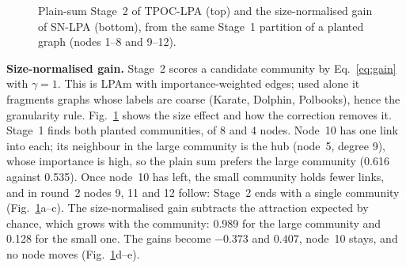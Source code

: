 \documentclass[conference]{IEEEtran}
\begin{document}
\begin{figure}[t]
\caption{Plain-sum Stage~2 of TPOC-LPA (top) and the size-normalised gain of SN-LPA (bottom), from the same Stage~1 partition of a planted graph (nodes 1--8 and 9--12).}
\label{fig:m3}
\end{figure}


\textbf{Size-normalised gain.} Stage~2 scores a candidate community by Eq.~\eqref{eq:gain} with $\gamma=1$. This is LPAm with importance-weighted edges; used alone it fragments graphs whose labels are coarse (Karate, Dolphin, Polbooks), hence the granularity rule. Fig.~\ref{fig:m3} shows the size effect and how the correction removes it. Stage~1 finds both planted communities, of 8 and 4 nodes. Node~10 has one link into each; its neighbour in the large community is the hub (node~5, degree 9), whose importance is high, so the plain sum prefers the large community (0.616 against 0.535). Once node~10 has left, the small community holds fewer links, and in round~2 nodes 9, 11 and 12 follow: Stage~2 ends with a single community (Fig.~\ref{fig:m3}a--c). The size-normalised gain subtracts the attraction expected by chance, which grows with the community: 0.989 for the large community and 0.128 for the small one. The gains become $-0.373$ and $0.407$, node~10 stays, and no node moves (Fig.~\ref{fig:m3}d--e).
\end{document}
